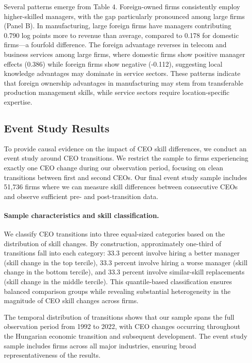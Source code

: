 \documentclass[11pt,a4paper]{article}
\begin{document}
Several patterns emerge from Table 4. Foreign-owned firms consistently employ higher-skilled managers, with the gap particularly pronounced among large firms (Panel B). In manufacturing, large foreign firms have managers contributing 0.790 log points more to revenue than average, compared to 0.178 for domestic firms—a fourfold difference. The foreign advantage reverses in telecom and business services among large firms, where domestic firms show positive manager effects (0.386) while foreign firms show negative (-0.112), suggesting local knowledge advantages may dominate in service sectors. These patterns indicate that foreign ownership advantages in manufacturing may stem from transferable production management skills, while service sectors require location-specific expertise.

\subsection{Event Study Results}

To provide causal evidence on the impact of CEO skill differences, we conduct an event study around CEO transitions. We restrict the sample to firms experiencing exactly one CEO change during our observation period, focusing on clean transitions between first and second CEOs. Our final event study sample includes 51,736 firms where we can measure skill differences between consecutive CEOs and observe sufficient pre- and post-transition data.

\paragraph{Sample characteristics and skill classification.} We classify CEO transitions into three equal-sized categories based on the distribution of skill changes. By construction, approximately one-third of transitions fall into each category: 33.3 percent involve hiring a better manager (skill change in the top tercile), 33.3 percent involve hiring a worse manager (skill change in the bottom tercile), and 33.3 percent involve similar-skill replacements (skill change in the middle tercile). This quantile-based classification ensures balanced comparison groups while revealing substantial heterogeneity in the magnitude of CEO skill changes across firms.

The temporal distribution of transitions shows that our sample spans the full observation period from 1992 to 2022, with CEO changes occurring throughout the Hungarian economic transition and subsequent development. The event study sample includes firms across all major industries, ensuring broad representativeness of the results.
\end{document}
